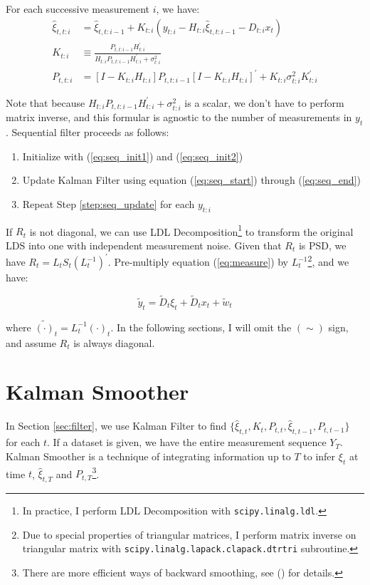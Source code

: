 \documentclass[12pt]{article}
\newenvironment{boenumerate}
    {\begin{enumerate}\renewcommand\labelenumi{\textbf\theenumi}}
    {\end{enumerate}}
\numberwithin{equation}{section}
\begin{document}
For each successive measurement $i$, we have:
\begin{align}
    \hat{\xi}_{t,t:i} &= \hat{\xi}_{t,t:i-1} + K_{t:i}(y_{t:i} - H_{t:i}\hat{\xi}_{t,t:i-1} - D_{t:i}x_{t}) \label{eq:seq_start} \\ 
    K_{t:i} &\equiv \frac{P_{t,t:i-1}H_{t:i}^{'}}{H_{t:i}P_{t,t:i-1}H_{t:i}^{'}+\sigma_{t:i}^{2}} \\
    P_{t,t:i} &= [I - K_{t:i}H_{t:i}]P_{t,t:i-1}[I-K_{t:i}H_{t:i}]^{'} + K_{t:i}\sigma_{t:i}^{2}K_{t:i}^{'} \label{eq:seq_end}
\end{align}

Note that because $H_{t:i}P_{t,t:i-1}H_{t:i}^{'}+\sigma_{t:i}^{2}$ is a scalar, we don't have to perform matrix inverse, and this formular is agnostic to the number of measurements in $y_t$. Sequential filter proceeds as follows:
\begin{boenumerate}
    \item Initialize with (\ref{eq:seq_init1}) and (\ref{eq:seq_init2})
    \item \label{step:seq_update} Update Kalman Filter using equation (\ref{eq:seq_start}) through (\ref{eq:seq_end})
    \item Repeat Step \ref{step:seq_update} for each $y_{t:i}$
\end{boenumerate}

If $R_t$ is not diagonal, we can use LDL Decomposition\footnote{In practice, I perform LDL Decomposition with \texttt{scipy.linalg.ldl}.} to transform the original LDS into one with independent measurement noise. Given that $R_t$ is PSD, we have $R_t = L_tS_t(L_t^{-1})^{'}$. Pre-multiply equation (\ref{eq:measure}) by $L_t^{-1}$\footnote{Due to special properties of triangular matrices, I perform matrix inverse on triangular matrix with \texttt{scipy.linalg.lapack.clapack.dtrtri} subroutine.}, and we have:

\[
    \tilde{y}_t = \tilde{D}_t\xi_{t} + \tilde{D}_{t}x_t + \tilde{w}_t
\]

where $\tilde{(\cdot)}_t = L_t^{-1}(\cdot)_t$. In the following sections, I will omit the $(\sim)$ sign, and assume $R_t$ is always diagonal. 

\section{Kalman Smoother} \label{sec:smoother}
In Section \ref{sec:filter}, we use Kalman Filter to find $\{\hat{\xi}_{t,t}, K_t, P_{t,t}, \hat{\xi}_{t,t-1}, P_{t,t-1}\}$ for each $t$. If a dataset is given, we have the entire measurement sequence $Y_T$. Kalman Smoother is a technique of integrating information up to $T$ to infer $\xi_t$ at time $t$, $\hat{\xi}_{t,T}$ and $P_{t,T}$\footnote{There are more efficient ways of backward smoothing, see (\cite{koopman_1993}) for details.}. 
\end{document}
